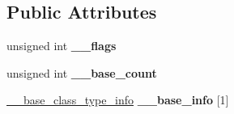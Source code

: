 \subsection*{Public Attributes}
\begin{DoxyCompactItemize}
\item 
\hypertarget{class____cxxabiv1_1_1____vmi__class__type__info_a26be6edc0424fc216a5c422a8d81042c}{unsigned int {\bfseries \+\_\+\+\_\+flags}}\label{class____cxxabiv1_1_1____vmi__class__type__info_a26be6edc0424fc216a5c422a8d81042c}

\item 
\hypertarget{class____cxxabiv1_1_1____vmi__class__type__info_aaf9761dc80f8a52aa73ece4653526292}{unsigned int {\bfseries \+\_\+\+\_\+base\+\_\+count}}\label{class____cxxabiv1_1_1____vmi__class__type__info_aaf9761dc80f8a52aa73ece4653526292}

\item 
\hypertarget{class____cxxabiv1_1_1____vmi__class__type__info_a3b1ca33e587c0edda95ab9d0ab809882}{\hyperlink{class____cxxabiv1_1_1____base__class__type__info}{\+\_\+\+\_\+base\+\_\+class\+\_\+type\+\_\+info} {\bfseries \+\_\+\+\_\+base\+\_\+info} \mbox{[}1\mbox{]}}\label{class____cxxabiv1_1_1____vmi__class__type__info_a3b1ca33e587c0edda95ab9d0ab809882}

\end{DoxyCompactItemize}
